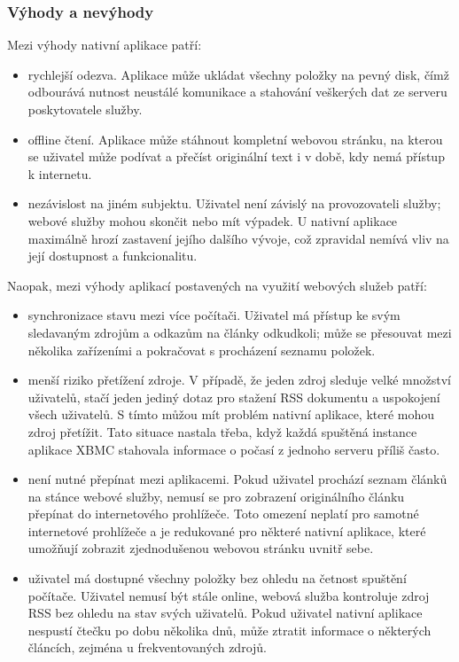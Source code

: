 \subsubsection{Výhody a nevýhody}

Mezi výhody nativní aplikace patří:
\begin{itemize}
    \item rychlejší odezva.
        Aplikace může ukládat všechny položky na pevný disk, čímž odbourává nutnost neustálé komunikace a stahování veškerých dat ze serveru poskytovatele služby.
    \item offline čtení.
        Aplikace může stáhnout kompletní webovou stránku, na kterou se uživatel může podívat a přečíst originální text i v době, kdy nemá přístup k internetu.
    \item nezávislost na jiném subjektu.
        Uživatel není závislý na provozovateli služby; webové služby mohou skončit nebo mít výpadek.
        U nativní aplikace maximálně hrozí zastavení jejího dalšího vývoje, což zpravidal nemívá vliv na její dostupnost a funkcionalitu.
\end{itemize}

Naopak, mezi výhody aplikací postavených na využití webových služeb patří:
\begin{itemize}
    \item synchronizace stavu mezi více počítači.
        Uživatel má přístup ke svým sledavaným zdrojům a odkazům na články odkudkoli; může se přesouvat mezi několika zařízeními a pokračovat s procházení seznamu položek.
    \item menší riziko přetížení zdroje.
        V případě, že jeden zdroj sleduje velké množství uživatelů, stačí jeden jediný dotaz pro stažení RSS dokumentu a uspokojení všech uživatelů.
        S tímto můžou mít problém nativní aplikace, které mohou zdroj přetížit.
        Tato situace nastala třeba, když každá spuštěná instance aplikace XBMC stahovala informace o počasí z jednoho serveru příliš často.
    \item není nutné přepínat mezi aplikacemi.
        Pokud uživatel prochází seznam člán\-ků na stánce webové služby, nemusí se pro zobrazení originálního článku přepínat do internetového prohlížeče.
        Toto omezení neplatí pro samotné internetové prohlížeče a je redukované pro některé nativní aplikace, které umožňují zobrazit zjednodušenou webovou stránku uvnitř sebe.
    \item uživatel má dostupné všechny položky bez ohledu na četnost spuštění počítače.
        Uživatel nemusí být stále online, webová služba kontroluje zdroj RSS bez ohledu na stav svých uživatelů.
        Pokud uživatel nativní aplikace nespustí čtečku po dobu několika dnů, může ztratit informace o některých článcích, zejména u frekventovaných zdrojů.
\end{itemize}

